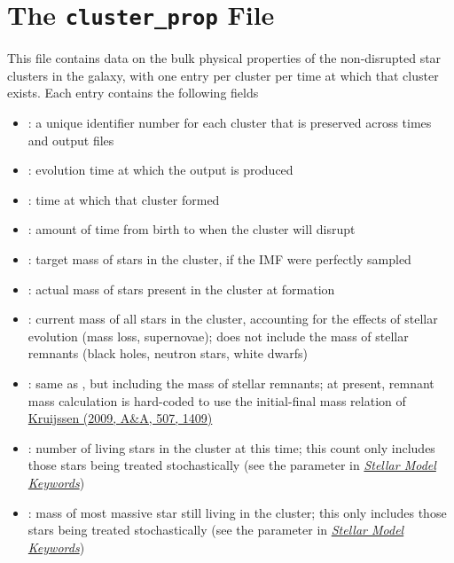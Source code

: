 \documentclass[letterpaper,10pt,english]{sphinxmanual}
\begin{document}
\section{The \texttt{cluster\_prop} File}
\label{output:the-cluster-prop-file}
This file contains data on the bulk physical properties of the non-disrupted star clusters in the galaxy, with one entry per cluster per time at which that cluster exists. Each entry contains the following fields
\begin{itemize}
\item {} 
: a unique identifier number for each cluster that is preserved across times and output files

\item {} 
: evolution time at which the output is produced

\item {} 
: time at which that cluster formed

\item {} 
: amount of time from birth to when the cluster will disrupt

\item {} 
: target mass of stars in the cluster, if the IMF were perfectly sampled

\item {} 
: actual mass of stars present in the cluster at formation

\item {} 
: current mass of all stars in the cluster, accounting for the effects of stellar evolution (mass loss, supernovae); does not include the mass of stellar remnants (black holes, neutron stars, white dwarfs)

\item {} 
: same as , but including the mass of stellar remnants; at present, remnant mass calculation is hard-coded to use the initial-final mass relation of \href{http://adsabs.harvard.edu/abs/2009A\%26A...507.1409K}{Kruijssen (2009, A\&A, 507, 1409)}

\item {} 
: number of living stars in the cluster at this time; this count only includes those stars being treated stochastically (see the parameter  in {\hyperref[parameters:ssec\string-stellar\string-keywords]{\emph{Stellar Model Keywords}}})

\item {} 
: mass of most massive star still living in the cluster; this only includes those stars being treated stochastically (see the parameter  in {\hyperref[parameters:ssec\string-stellar\string-keywords]{\emph{Stellar Model Keywords}}})


\end{itemize}
\end{document}
